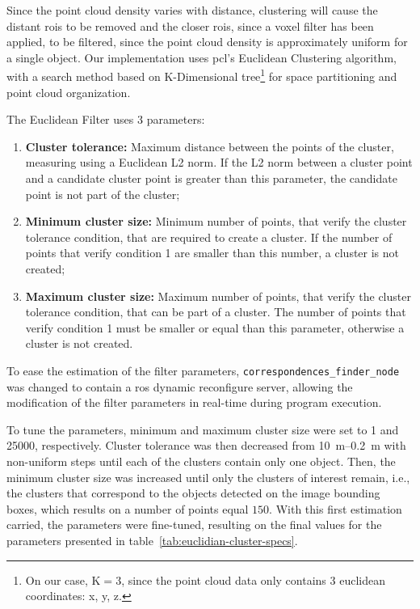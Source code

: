 Since the point cloud density varies with distance, clustering will cause the distant \acp{roi} to be removed and the closer \acp{roi}, since a voxel filter has been applied, to be filtered, since the point cloud density is approximately uniform for a single object. Our implementation uses \ac{pcl}'s Euclidean Clustering algorithm, with a search method based on K-Dimensional tree\footnote{On our case, K$=3$, since the point cloud data only contains 3 euclidean coordinates: x, y, z.} for space partitioning and point cloud organization.

The Euclidean Filter uses 3 parameters:

\begin{enumerate}
	\item \textbf{Cluster tolerance:} Maximum distance between the points of the cluster, measuring using a Euclidean L2 norm. If the L2 norm between a cluster point and a candidate cluster point is greater than this parameter, the candidate point is not part of the cluster;
	\item \textbf{Minimum cluster size:} Minimum number of points, that verify the cluster tolerance condition, that are required to create a cluster. If the number of points that verify condition 1 are smaller than this number, a cluster is not created;
	\item \textbf{Maximum cluster size:} Maximum number of points, that verify the cluster tolerance condition, that can be part of a cluster. The number of points that verify condition 1 must be smaller or equal than this parameter, otherwise a cluster is not created.
\end{enumerate}

To ease the estimation of the filter parameters, \texttt{correspondences\_finder\_node} was changed to contain a \ac{ros} dynamic reconfigure server, allowing the modification of the filter parameters in real-time during program execution. 

To tune the parameters, minimum and maximum cluster size were set to 1 and 25000, respectively. Cluster tolerance was then decreased from \SIrange{10}{0.2}{\meter} with non-uniform steps until each of the clusters contain only one object. Then, the minimum cluster size was increased until only the clusters of interest remain, i.e., the clusters that correspond to the objects detected on the image bounding boxes, which results on a number of points equal $150$. With this first estimation carried, the parameters were fine-tuned, resulting on the final values for the parameters presented in table~\ref{tab:euclidian-cluster-specs}.

